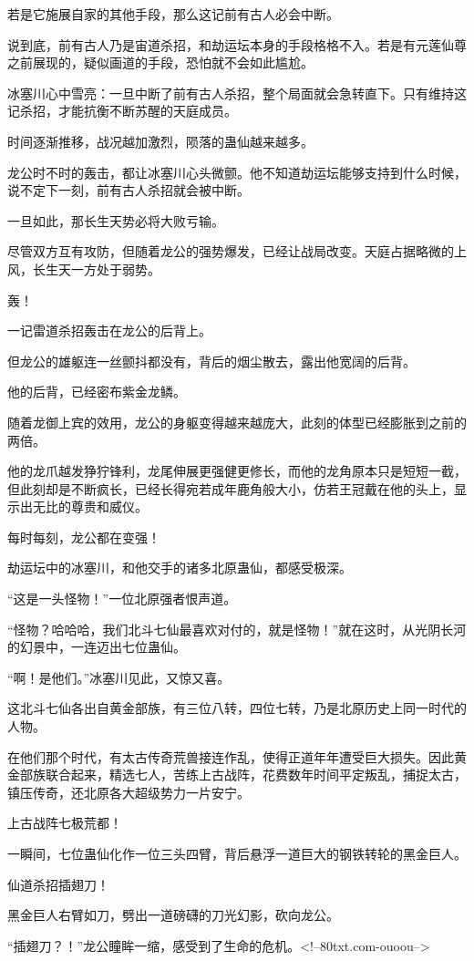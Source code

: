 \begin{this_body}
若是它施展自家的其他手段，那么这记前有古人必会中断。

说到底，前有古人乃是宙道杀招，和劫运坛本身的手段格格不入。若是有元莲仙尊之前展现的，疑似画道的手段，恐怕就不会如此尴尬。

冰塞川心中雪亮：一旦中断了前有古人杀招，整个局面就会急转直下。只有维持这记杀招，才能抗衡不断苏醒的天庭成员。

时间逐渐推移，战况越加激烈，陨落的蛊仙越来越多。

龙公时不时的轰击，都让冰塞川心头微颤。他不知道劫运坛能够支持到什么时候，说不定下一刻，前有古人杀招就会被中断。

一旦如此，那长生天势必将大败亏输。

尽管双方互有攻防，但随着龙公的强势爆发，已经让战局改变。天庭占据略微的上风，长生天一方处于弱势。

轰！

一记雷道杀招轰击在龙公的后背上。

但龙公的雄躯连一丝颤抖都没有，背后的烟尘散去，露出他宽阔的后背。

他的后背，已经密布紫金龙鳞。

随着龙御上宾的效用，龙公的身躯变得越来越庞大，此刻的体型已经膨胀到之前的两倍。

他的龙爪越发狰狞锋利，龙尾伸展更强健更修长，而他的龙角原本只是短短一截，但此刻却是不断疯长，已经长得宛若成年鹿角般大小，仿若王冠戴在他的头上，显示出无比的尊贵和威仪。

每时每刻，龙公都在变强！

劫运坛中的冰塞川，和他交手的诸多北原蛊仙，都感受极深。

“这是一头怪物！”一位北原强者恨声道。

“怪物？哈哈哈，我们北斗七仙最喜欢对付的，就是怪物！”就在这时，从光阴长河的幻景中，一连迈出七位蛊仙。

“啊！是他们。”冰塞川见此，又惊又喜。

这北斗七仙各出自黄金部族，有三位八转，四位七转，乃是北原历史上同一时代的人物。

在他们那个时代，有太古传奇荒兽接连作乱，使得正道年年遭受巨大损失。因此黄金部族联合起来，精选七人，苦练上古战阵，花费数年时间平定叛乱，捕捉太古，镇压传奇，还北原各大超级势力一片安宁。

上古战阵七极荒都！

一瞬间，七位蛊仙化作一位三头四臂，背后悬浮一道巨大的钢铁转轮的黑金巨人。

仙道杀招插翅刀！

黑金巨人右臂如刀，劈出一道磅礴的刀光幻影，砍向龙公。

“插翅刀？！”龙公瞳眸一缩，感受到了生命的危机。<!--80txt.com-ouoou-->

\end{this_body}

